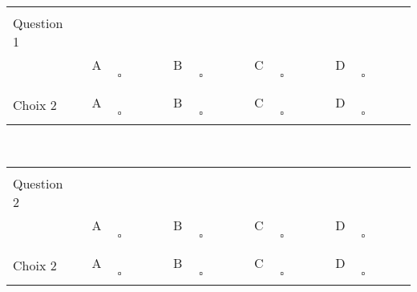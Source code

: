 \documentclass{book}%
\begin{document}
\begin{center}%
\begin{tabular}{| l l l l l |}%
\hline%
 & & & & \\%
Question 1\qquad \qquad\ & & & & \\%
 & A $\qquad \square \qquad$ & B $\qquad \square \qquad$ & C $\qquad \square \qquad$ & D $\qquad \square \qquad$ \\ %
 & & & &  \\%
\hline%
 & & & &  \\%
Choix 2 & A $\qquad \square \qquad$ & B $\qquad \square \qquad$ & C $\qquad \square \qquad$ & D $\qquad \square \qquad$ \\ %
 & & & &  \\%
\hline%
\end{tabular}%
\\ \vskip3mm%
\thispagestyle{empty}%
\begin{tabular}{| l l l l l |}%
\hline%
 & & & & \\%
Question 2\qquad \qquad\ & & & & \\%
 & A $\qquad \square \qquad$ & B $\qquad \square \qquad$ & C $\qquad \square \qquad$ & D $\qquad \square \qquad$ \\ %
 & & & &  \\%
\hline%
 & & & &  \\%
Choix 2 & A $\qquad \square \qquad$ & B $\qquad \square \qquad$ & C $\qquad \square \qquad$ & D $\qquad \square \qquad$ \\ %
 & & & &  \\%
\hline%
\end{tabular}%
\\ \vskip3mm%
\thispagestyle{empty}%
\end{center}%
\end{document}
